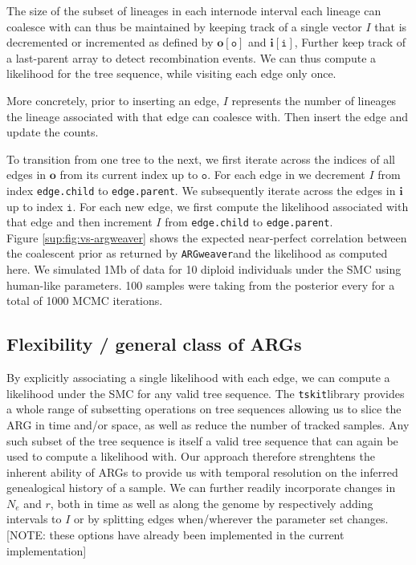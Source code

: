 \documentclass{article}
\newcommand{\argweaver}[0]{\texttt{ARGweaver}}
\newcommand{\tskit}[0]{\texttt{tskit}}
\begin{document}
The size of the subset of lineages in each internode interval each lineage 
can coalesce with can thus be maintained by keeping track of a single vector $I$ 
that is decremented or incremented as defined by
$\textbf{o}[\texttt{o}]$ and $\textbf{i}[\texttt{i}]$, 
Further keep track of a last-parent array to detect recombination events.
We can thus compute a likelihood for the tree sequence, while visiting each edge only once.

More concretely, prior to inserting an edge, $I$ represents the number of lineages 
the lineage associated with 
that edge can coalesce with. Then insert the edge and update the counts.

To transition from one tree to the next, we first iterate across the indices of all edges 
in $\textbf{o}$ from its current index up to $\texttt{o}$. For each edge in we decrement $I$ 
from index \texttt{edge.child} to \texttt{edge.parent}. We subsequently iterate across the 
edges in $\textbf{i}$ up to index $\texttt{i}$. For each new edge, we first compute the likelihood 
associated with that edge and then 
increment $I$ from \texttt{edge.child} to \texttt{edge.parent}.\\

Figure \ref{sup:fig:vs-argweaver} shows the expected near-perfect correlation 
between the coalescent prior as returned by \argweaver and the likelihood as computed here. 
We simulated 1Mb of data for 10 diploid individuals 
under the SMC using human-like parameters. 100 samples were taking from the posterior every for 
a total of 1000 MCMC iterations.
 

\subsection{Flexibility / general class of ARGs}

By explicitly associating a single likelihood with each edge, we can compute a likelihood 
under the SMC for any valid tree sequence. The \tskit library provides a whole range  
of subsetting operations on tree sequences allowing us to slice the ARG in time and/or space, 
as well as reduce the number of tracked samples. 
Any such subset of the tree sequence is itself a valid tree sequence 
that can again be used to compute a likelihood with. Our approach therefore strenghtens 
the inherent ability of ARGs to provide us with temporal 
resolution on the inferred genealogical history of a sample. 
We can further readily incorporate changes in $N_e$ and $r$, 
both in time as well as along the genome by respectively adding intervals to $I$ 
or by splitting edges when/wherever the parameter set changes.
[NOTE: these options have already been implemented in the current implementation]
\end{document}

